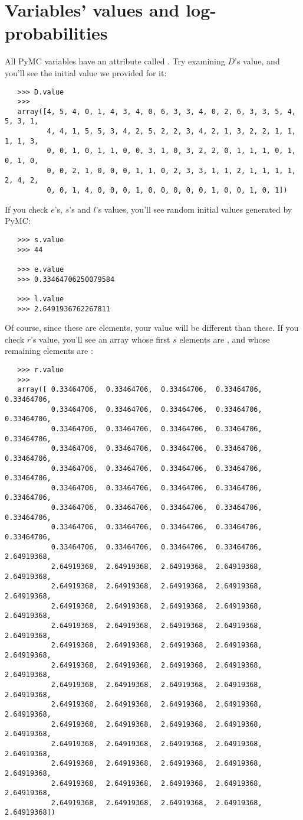 \section*{Variables' values and log-probabilities}
All PyMC variables have an attribute called . Try examining $D$'s value, and you'll see the initial value we provided for it:
\begin{verbatim}
   >>> D.value
   >>> 
   array([4, 5, 4, 0, 1, 4, 3, 4, 0, 6, 3, 3, 4, 0, 2, 6, 3, 3, 5, 4, 5, 3, 1,
          4, 4, 1, 5, 5, 3, 4, 2, 5, 2, 2, 3, 4, 2, 1, 3, 2, 2, 1, 1, 1, 1, 3,
          0, 0, 1, 0, 1, 1, 0, 0, 3, 1, 0, 3, 2, 2, 0, 1, 1, 1, 0, 1, 0, 1, 0,
          0, 0, 2, 1, 0, 0, 0, 1, 1, 0, 2, 3, 3, 1, 1, 2, 1, 1, 1, 1, 2, 4, 2,
          0, 0, 1, 4, 0, 0, 0, 1, 0, 0, 0, 0, 0, 1, 0, 0, 1, 0, 1])
\end{verbatim}
If you check $e$'s, $s$'s and $l$'s values, you'll see random initial values generated by PyMC:
\begin{verbatim}
   >>> s.value
   >>> 44

   >>> e.value
   >>> 0.33464706250079584

   >>> l.value
   >>> 2.6491936762267811
\end{verbatim}
Of course, since these are  elements, your value will be different than these. If you check $r$'s value, you'll see an array whose first $s$ elements are , and whose remaining elements are :
\begin{verbatim}
   >>> r.value
   >>> 
   array([ 0.33464706,  0.33464706,  0.33464706,  0.33464706,  0.33464706,
           0.33464706,  0.33464706,  0.33464706,  0.33464706,  0.33464706,
           0.33464706,  0.33464706,  0.33464706,  0.33464706,  0.33464706,
           0.33464706,  0.33464706,  0.33464706,  0.33464706,  0.33464706,
           0.33464706,  0.33464706,  0.33464706,  0.33464706,  0.33464706,
           0.33464706,  0.33464706,  0.33464706,  0.33464706,  0.33464706,
           0.33464706,  0.33464706,  0.33464706,  0.33464706,  0.33464706,
           0.33464706,  0.33464706,  0.33464706,  0.33464706,  0.33464706,
           0.33464706,  0.33464706,  0.33464706,  0.33464706,  2.64919368,
           2.64919368,  2.64919368,  2.64919368,  2.64919368,  2.64919368,
           2.64919368,  2.64919368,  2.64919368,  2.64919368,  2.64919368,
           2.64919368,  2.64919368,  2.64919368,  2.64919368,  2.64919368,
           2.64919368,  2.64919368,  2.64919368,  2.64919368,  2.64919368,
           2.64919368,  2.64919368,  2.64919368,  2.64919368,  2.64919368,
           2.64919368,  2.64919368,  2.64919368,  2.64919368,  2.64919368,
           2.64919368,  2.64919368,  2.64919368,  2.64919368,  2.64919368,
           2.64919368,  2.64919368,  2.64919368,  2.64919368,  2.64919368,
           2.64919368,  2.64919368,  2.64919368,  2.64919368,  2.64919368,
           2.64919368,  2.64919368,  2.64919368,  2.64919368,  2.64919368,
           2.64919368,  2.64919368,  2.64919368,  2.64919368,  2.64919368,
           2.64919368,  2.64919368,  2.64919368,  2.64919368,  2.64919368,
           2.64919368,  2.64919368,  2.64919368,  2.64919368,  2.64919368])
\end{verbatim}
